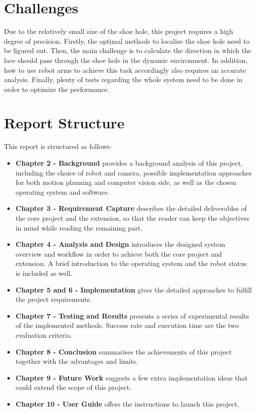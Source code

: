 \section{Challenges}
Due to the relatively small size of the shoe hole, this project requires a high degree of precision. Firstly, the optimal methods to localize the shoe hole need to be figured out. Then, the main challenge is to calculate the direction in which the lace should pass through the shoe hole in the dynamic environment. In addition, how to use robot arms to achieve this task accordingly also requires an accurate analysis. Finally, plenty of tests regarding the whole system need to be done in order to optimize the performance.

\section{Report Structure}
This report is structured as follows:

\begin{itemize}
    \item \textbf{Chapter 2 - Background} provides a background analysis of this project, including the choice of robot and camera, possible implementation approaches for both motion planning and computer vision side, as well as the chosen operating system and software. 
    \item \textbf{Chapter 3 - Requirement Capture} describes the detailed deliverables of the core project and the extension, so that the reader can keep the objectives in mind while reading the remaining part.
    \item \textbf{Chapter 4 - Analysis and Design} introduces the designed system overview and workflow in order to achieve both the core project and extension. A brief introduction to the operating system and the robot status is included as well.
    \item \textbf{Chapter 5 and 6 - Implementation} gives the detailed approaches to fulfill the project requirements.
    \item \textbf{Chapter 7 - Testing and Results} presents a series of experimental results of the implemented methods. Success rate and execution time are the two evaluation criteria.
    \item \textbf{Chapter 8 - Conclusion} summarises the achievements of this project together with the advantages and limits. 
    \item \textbf{Chapter 9 - Future Work} suggests a few extra implementation ideas that could extend the scope of this project. 
    \item \textbf{Chapter 10 - User Guide} offers the instructions to launch this project.
\end{itemize}
